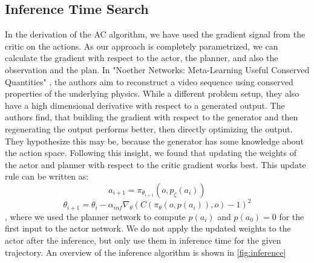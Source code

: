 \subsection{Inference Time Search}
\label{sec:inf_time_search}
In the derivation of the AC algorithm, we have used the gradient signal from the critic on the actions. As our approach is completely parametrized, we can calculate 
the gradient with respect to the actor, the planner, and also the observation and the plan. In "Noether Networks: Meta-Learning Useful Conserved Quantities" \cite{https://arxiv.org/abs/2112.03321}, 
the authors aim to reconstruct a video sequence 
using conserved properties of the underlying physics. While a different problem setup, they also have a high dimensional derivative with respect to a 
generated output. The authors find, that 
building the gradient with respect to the generator and then regenerating the output performs better, then directly optimizing the output. They hypothesize this 
may be, because the generator has some knowledge about the action space. Following this insight, we found that updating the weights of the actor and planner 
with respect to the critic gradient works best. This update rule can be written as:
\begin{equation}
    a_{i+1} = \pi_{\theta_{i+1}}(o, p_{\zeta}(a_i))
\end{equation}
\begin{equation}
    \theta_{i+1} = \theta_i - \alpha_{inf} \nabla_{\theta} (C(\pi_{\theta}(o, p(a_i)), o) - 1)^2
\end{equation}
, where we used the planner network to compute $p(a_i)$ and $p(a_0) = 0$ for the first input to the actor network. 
We do not apply the updated weights to the actor after the inference, but only use them in inference time for the given trajectory.  An overview of the inference 
algorithm is shown in \ref{fig:inference}

